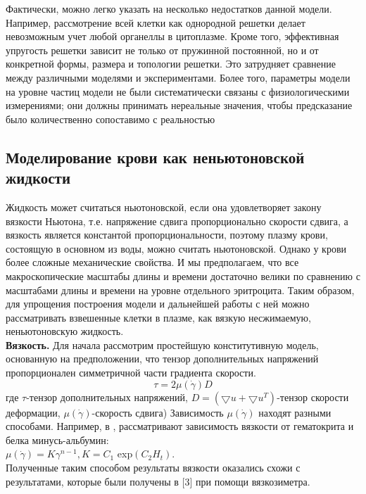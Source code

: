Фактически, можно легко указать на несколько недостатков данной модели. Например, рассмотрение всей клетки как однородной решетки делает невозможным учет любой органеллы в цитоплазме. Кроме того, эффективная упругость решетки зависит не только от пружинной постоянной, но и от конкретной формы, размера и топологии решетки. Это затрудняет сравнение между различными моделями и экспериментами. Более того, параметры модели на уровне частиц  модели не были систематически связаны с физиологическими измерениями; они должны принимать нереальные значения, чтобы предсказание было количественно сопоставимо с реальностью 


\subsection{Моделирование крови как неньютоновской жидкости}
Жидкость может считаться ньютоновской, если она удовлетворяет закону вязкости Ньютона, т.е. напряжение сдвига пропорционально скорости сдвига, а вязкость является константой пропорциональности, поэтому плазму крови, состоящую в основном из воды, можно считать ньютоновской. Однако у крови более сложные механические свойства. И мы предполагаем, что все макроскопические масштабы длины и времени достаточно велики по сравнению с масштабами длины и времени на уровне отдельного эритроцита. Таким образом, для упрощения построения модели и дальнейшей работы с ней можно рассматривать взвешенные клетки в плазме, как вязкую несжимаемую, неньютоновскую жидкость.\\

\textbf{Вязкость.}
Для начала рассмотрим простейшую конститутивную модель, основанную на предположении, что тензор дополнительных напряжений пропорционален
симметричной части градиента скорости.\\
$$\tau=2\mu (\dot{\gamma})D$$
где $\tau $-тензор дополнительных напряжений, $D=(\bigtriangledown u+\bigtriangledown u^T)$-тензор скорости деформации, $\mu (\dot{\gamma})$-скорость сдвига)
Зависимость $\mu (\dot{\gamma})$ находят разными способами. Например, в \cite{walburn:1976},   рассматривают зависимость вязкости от гематокрита и белка минусь-альбумин: \\
$\mu (\dot{\gamma})=K{\gamma}^{n-1},  K=C_1$ exp$(C_2 H_t).$\\
Полученные таким способом результаты вязкости оказались схожи с результатами, которые были получены в [3] при помощи вязкозиметра.\\

